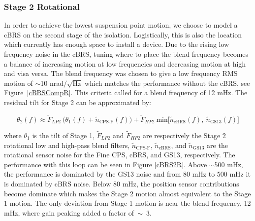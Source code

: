 \documentclass [12pt, proquest]{uwthesis}[2019]
\begin{document}
\subsubsection{Stage 2 Rotational}


In order to achieve the lowest suspension point motion, we choose to model a cBRS on the second stage of the isolation. Logistically, this is also the location which currently has enough space to install a device. Due to the rising low frequency noise in the cBRS, tuning where to place the blend frequency becomes a balance of increasing motion at low frequencies and decreasing motion at high and visa versa. The blend frequency was chosen to give a low frequency RMS motion of $\sim$10 nrad$/\sqrt{\text{Hz}}$ which matches the performance without the cBRS, see Figure~\ref{cBRSCompR}. This criteria called for a blend frequency of 12 mHz. The residual tilt for Stage 2 can be approximated by:

\begin{equation}
\theta_2(f)\approx \tilde{F}_{LP2}\ \big(\theta_1(f)+\tilde{n}_\text{CPS-F}(f)\big)+\tilde{F}_{HP2}\ \text{min}\big[\tilde{n}_\text{cBRS}(f),\ \tilde{n}_\text{GS13}(f)\big]
\end{equation}

where $\theta_1$ is the tilt of Stage 1, $\tilde{F}_{LP2}$ and $\tilde{F}_{HP2}$ are respectively the Stage 2 rotational low and high-pass blend filters, $\tilde{n}_\text{CPS-F}$, $\tilde{n}_\text{cBRS}$, and $\tilde{n}_\text{GS13}$ are the rotational sensor noise for the Fine CPS, cBRS, and GS13, respectively. The performance with this loop can be seen in Figure \ref{cBRS2R}. Above $\sim$500 mHz, the performance is dominated by the GS13 noise and from 80 mHz to 500 mHz it is dominated by cBRS noise. Below 80 mHz, the position sensor contributions become dominate which makes the Stage 2 motion almost equivalent to the Stage 1 motion. The only deviation from Stage 1 motion is near the blend frequency, 12 mHz, where gain peaking added a factor of~$\sim$~3. 
\end{document}
